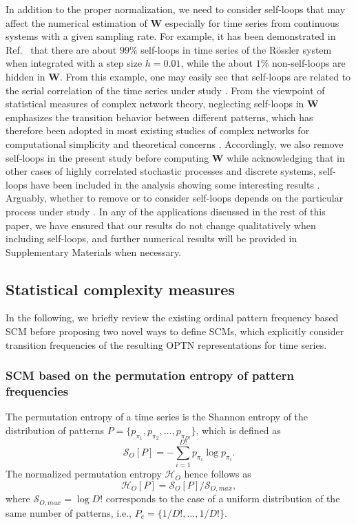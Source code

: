 \documentclass[aip,cha,reprint,nofootinbib]{revtex4-1}
\begin{document}
In addition to the proper normalization, we need to consider self-loops that may affect the numerical estimation of $\mathbf{W}$ especially for time series from continuous systems with a given sampling rate. For example, it has been demonstrated in Ref.~\cite{zhangSciRep2017} that there are about $99\%$ self-loops in time series of the R\"ossler system when integrated with a step size $h = 0.01$, while the about $1\%$ non-self-loops are hidden in $\mathbf{W}$. From this example, one may easily see that self-loops are related to the serial correlation of the time series under study \cite{BorgesAMC2019}. {\color{red} From the viewpoint of statistical measures of complex network theory}, neglecting self-loops in $\mathbf{W}$ emphasizes the transition behavior between different patterns, which has therefore been adopted in most existing studies of complex networks for computational simplicity and theoretical concerns \cite{CostaADPhy2007}. Accordingly, we also remove self-loops in the present study before computing $\mathbf{W}$ while acknowledging that in other cases of {\color{red} highly correlated} stochastic processes and discrete systems, self-loops have been included in the analysis showing some interesting results \cite{BorgesAMC2019}. Arguably, whether to remove or to consider self-loops depends on the particular process under study \cite{PessaPRE2019}. In any of the applications discussed in the rest of this paper, we have ensured that our results do not change qualitatively when including self-loops{\color{red}, and further numerical results will be provided in Supplementary Materials when necessary. }

\subsection{Statistical complexity measures} \label{sec:SCM}

In the following, we briefly review the existing ordinal pattern frequency based SCM before proposing two novel ways to define SCMs, which explicitly consider transition frequencies of the resulting OPTN representations for time series. 
 
\subsubsection{SCM based on the permutation entropy of pattern frequencies} 

The permutation entropy of a time series is the Shannon entropy of the distribution of patterns $P = \{p_{\pi_1}, p_{\pi_2},\ldots,p_{\pi_{D!}} \}$, which is defined as
\begin{equation}
\mathcal{S}_{O}[P]= - \sum_{i=1}^{D!} p_{\pi_i} \log p_{\pi_i}. 
\end{equation}
The normalized permutation entropy $\mathcal{H}_O$ hence follows as 
\begin{equation} \label{eq:Ho}
\mathcal{H}_{O}[P] = \mathcal{S}_{O}[P] / \mathcal{S}_{O, max}, 
\end{equation}
where $\mathcal{S}_{O, max} = \log D!$ corresponds to the case of a uniform distribution of the same number of patterns, i.e., $P_e = \{1/D!, \ldots, 1/D!\}$. 
\end{document}
